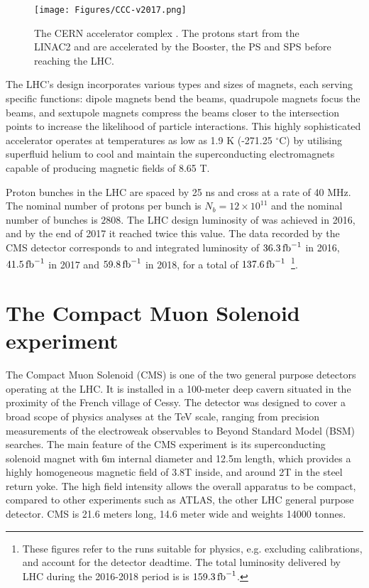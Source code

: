 \begin{figure}[htb]
\begin{center}
\texttt{[image: Figures/CCC-v2017.png]}
\end{center}
\caption{The CERN accelerator complex \cite{OPEN-PHO-ACCEL-2016-009}. The protons start from the LINAC2 and are accelerated by the Booster, the PS and SPS before reaching the LHC.}
\label{fig:CERNaccelerators}
\end{figure}

The LHC's design incorporates various types and sizes of magnets, each serving specific functions: dipole magnets bend the beams, quadrupole magnets focus the beams, and sextupole magnets compress the beams closer to the intersection points to increase the likelihood of particle interactions.
This highly sophisticated accelerator operates at temperatures as low as 1.9 K (-271.25 $^\circ$C) by utilising superfluid helium to cool and maintain the superconducting electromagnets capable of producing magnetic fields of 8.65 T.

Proton bunches in the LHC are spaced by 25 ns and cross at a rate of 40 MHz.
The nominal number of protons per bunch is $N_b = 12 \times 10^{11}$ and the nominal number of bunches is $2808$.
The LHC design luminosity of \LHigh was achieved in 2016, and by the end of 2017 it reached twice this value.
The data recorded by the CMS detector corresponds to and integrated luminosity of $36.3\mbox{\ensuremath{\,\text{fb}^{-1}}}$ in 2016, $41.5\mbox{\ensuremath{\,\text{fb}^{-1}}}$ in 2017 and $59.8\mbox{\ensuremath{\,\text{fb}^{-1}}}$ in 2018,
for a total of $137.6\mbox{\ensuremath{\,\text{fb}^{-1}}}$~\footnote{
These figures refer to the runs suitable for physics, e.g. excluding calibrations, and account for the detector deadtime.
The total luminosity delivered by LHC during the 2016-2018 period is is $159.3\mbox{\ensuremath{\,\text{fb}^{-1}}}$.}.

\section{The Compact Muon Solenoid experiment}
The Compact Muon Solenoid (CMS) is one of the two general purpose detectors operating at the LHC.
It is installed in a 100-meter deep cavern situated in the proximity of the French village of Cessy.
The detector was designed to cover a broad scope of physics analyses at the TeV scale, ranging from precision measurements of the electroweak observables to Beyond Standard Model (BSM) searches.
The main feature of the CMS experiment is its superconducting solenoid magnet with 6\usep m internal diameter and 12.5\usep m length, which provides a highly homogeneous magnetic field of 3.8\usep T inside, and around 2\usep T in the steel return yoke.
The high field intensity allows the overall apparatus to be compact, compared to other experiments such as ATLAS, the other LHC general purpose detector.
CMS is 21.6 meters long, 14.6 meter wide and weights 14000 tonnes.

